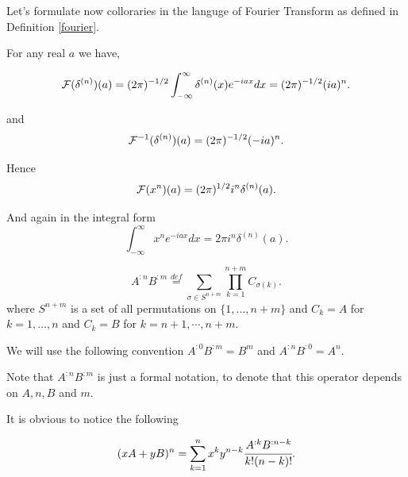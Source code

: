 \documentclass[main.tex]{subfiles}
\begin{document}
Let's formulate now colloraries in the languge of Fourier Transform as defined in Definition \ref{fourier}.

For any real $a$ we have,

\begin{equation}
\mathcal{F}(\delta^{(n)})(a) = (2\pi)^{-1/2} \int_{-\infty}^\infty \delta^{(n)}(x) e^{-iax} dx = 
(2\pi)^{-1/2} (ia)^n.
\end{equation}

and 
\begin{equation}
\mathcal{F}^{-1}(\delta^{(n)})(a) =  (2\pi)^{-1/2} (-ia)^n.
\end{equation}

Hence
\begin{equation}
\mathcal{F}(x^n)(a) = (2\pi)^{1/2}i^n \delta^{(n)}(a).
\end{equation}

And again in the integral form 
\begin{equation}
\int_{-\infty}^\infty x^n e^{-iax} dx = 2\pi i^n \delta^{(n)}(a).
\end{equation}

\begin{definition}
\begin{equation}
A^{:n} B^{:m} \stackrel{def}{=} \sum_{\sigma\in S^{n + m}} \prod_{k = 1}^{n + m} C_{\sigma(k)}.
\end{equation}
where $S^{n + m}$ is a set of all permutations on $\{1, \dots, n + m\}$ and
$C_k = A$ for $k = 1, \dots, n$ and $C_k = B$ for $k = n + 1, \cdots, n + m$.
\end{definition}

We will use the following convention $A^{:0}B^{:m} = B^m$ and $A^{:n}B^{:0} = A^n$.

Note that $A^{:n} B^{:m}$ is just a formal notation, to denote that this operator depends on $A, n, B$ and $m$.   

It is obvious to notice the following
\begin{lemma}
\begin{equation}
(xA + yB)^n = \sum_{k=1}^n x^k y^{n - k} \cfrac{A^{:k}B^{:n-k}}{k!(n - k)!}.
\end{equation}
\end{lemma}
\end{document}
